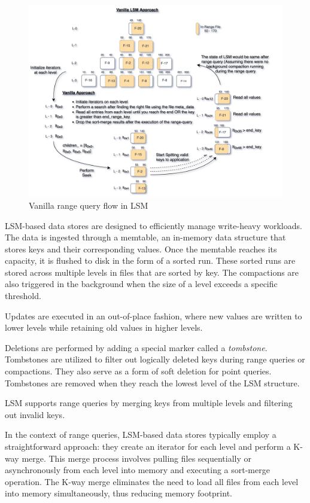 \begin{figure}
    \includegraphics[scale=0.10]{Figures/Vanilla Range Query vanilla.png}
    \caption{Vanilla range query flow in LSM}\label{fig:vanilla_range_query}
\end{figure}

LSM-based data stores are designed to efficiently manage write-heavy workloads. The data is ingested through 
a memtable, an in-memory data structure that stores keys and their corresponding values. Once the memtable reaches its 
capacity, it is flushed to disk in the form of a sorted run. These sorted runs are stored across multiple levels in 
files that are sorted by key. The compactions are also triggered in the background when the size of a level exceeds a 
specific threshold.

 Updates are executed in an out-of-place fashion, where new values are written to lower levels 
while retaining old values in higher levels.

 Deletions are performed by adding a special marker called a \textit{tombstone}. Tombstones are 
utilized to filter out logically deleted keys during range queries or compactions. They also serve as a form of soft 
deletion for point queries. Tombstones are removed when they reach the lowest level of the LSM structure.

 LSM supports range queries by merging keys from multiple levels and filtering out 
invalid keys.

In the context of range queries, LSM-based data stores typically employ a straightforward approach: they create an 
iterator for each level and perform a K-way merge. This merge process involves pulling files sequentially or 
asynchronously from each level into memory and executing a sort-merge operation. The K-way merge eliminates the need 
to load all files from each level into memory simultaneously, thus reducing memory footprint.

